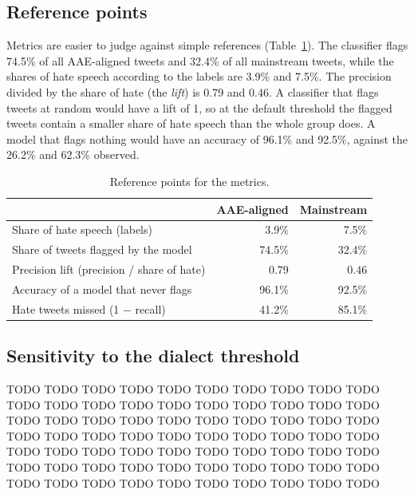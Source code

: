 \documentclass[runningheads,a4paper,oribibl]{llncs}
\begin{document}
\subsection{Reference points}
Metrics are easier to judge against simple references (Table~\ref{tab:reference}). The classifier
flags 74.5\% of all AAE-aligned tweets and 32.4\% of all mainstream tweets, while the shares of
hate speech according to the labels are 3.9\% and 7.5\%. The precision divided by the share of
hate (the \emph{lift}) is 0.79 and 0.46. A classifier that flags tweets at random would have a lift of 1,
so at the default threshold the flagged tweets contain a smaller share of hate speech than the whole group
does. A model that flags nothing would have an accuracy of 96.1\% and 92.5\%, against the 26.2\%
and 62.3\% observed.

\begin{table}
   \centering
   \begin{tabular}{|l|r|r|}
     \hline
     & \textbf{AAE-aligned} & \textbf{Mainstream}\\
     \hline
     Share of hate speech (labels) & 3.9\% & 7.5\%\\
     Share of tweets flagged by the model & 74.5\% & 32.4\%\\
     Precision lift (precision / share of hate) & 0.79 & 0.46\\
     Accuracy of a model that never flags & 96.1\% & 92.5\%\\
     Hate tweets missed (1 $-$ recall) & 41.2\% & 85.1\%\\
     \hline
   \end{tabular}
   \caption{Reference points for the metrics.\label{tab:reference}}
\end{table}


\subsection{Sensitivity to the dialect threshold}\label{sec:sensitivity}
TODO TODO TODO TODO TODO TODO TODO TODO TODO TODO TODO TODO TODO TODO TODO TODO TODO TODO TODO TODO TODO TODO TODO TODO TODO TODO TODO TODO TODO TODO TODO TODO TODO TODO TODO TODO TODO TODO TODO TODO TODO TODO TODO TODO TODO TODO TODO TODO TODO TODO TODO TODO TODO TODO TODO TODO TODO TODO TODO TODO TODO TODO TODO TODO TODO TODO TODO TODO TODO TODO
\end{document}
